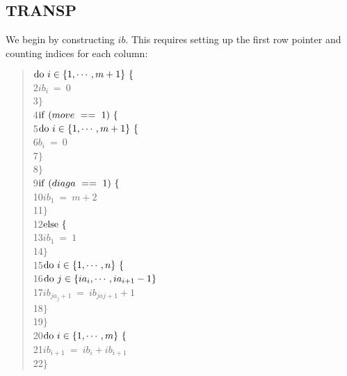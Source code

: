 \subsection{TRANSP}
 
We begin by constructing $ib$.  This requires setting up the first row
pointer and counting indices for each column:
\begin{quote}\hspace*{ 4em}$ {\rm do}\ i\in\{1,\cdots,m+1\}\ \{ $ \\
 2\hspace*{ 8em}$     ib_{i}\ =\ 0 $ \\
 3\hspace*{ 8em}$     \} $ \\
 4\hspace*{ 4em}$ {\rm if}\ (move\ ==\ 1)\ \{ $ \\
 5\hspace*{ 8em}$     {\rm do}\ i\in\{1,\cdots,m+1\}\ \{ $ \\
 6\hspace*{12em}$         b_{i}\ =\ 0 $ \\
 7\hspace*{12em}$         \} $ \\
 8\hspace*{ 8em}$     \} $ \\
 9\hspace*{ 4em}$ {\rm if}\ (diaga\ ==\ 1)\ \{ $ \\
10\hspace*{ 8em}$     ib_{1}\ =\ m + 2 $ \\
11\hspace*{ 8em}$     \} $ \\
12\hspace*{ 4em}$ {\rm else}\ \{ $ \\
13\hspace*{ 8em}$     ib_{1}\ =\ 1 $ \\
14\hspace*{ 8em}$     \} $ \\
15\hspace*{ 4em}$ {\rm do}\ i\in\{1,\cdots,n\}\ \{ $ \\
16\hspace*{ 8em}$     {\rm do}\ j\in\{ia_{i},\cdots,ia_{i+1}-1\} $ \\
17\hspace*{12em}$         ib_{ja_{j}+1}\ =\ ib_{ja{j}+1}+1 $ \\
18\hspace*{12em}$         \} $ \\
19\hspace*{ 8em}$     \} $ \\
20\hspace*{ 4em}$ {\rm do}\ i\in\{1,\cdots,m\}\ \{ $ \\
21\hspace*{ 8em}$    ib_{i+1}\ =\ ib_{i}+ib_{i+1} $ \\
22\hspace*{ 8em}$    \} $
\end{quote}     
